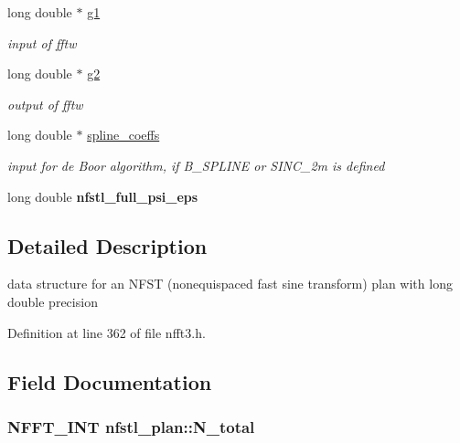 \begin{DoxyCompactItemize}
\item 
\hypertarget{structnfstl__plan_ac54e606a9b0c7c6b526fb3d44d28482a}{long double $\ast$ \hyperlink{structnfstl__plan_ac54e606a9b0c7c6b526fb3d44d28482a}{g1}}\label{structnfstl__plan_ac54e606a9b0c7c6b526fb3d44d28482a}

\begin{DoxyCompactList}\small\item\em input of fftw \end{DoxyCompactList}\item 
\hypertarget{structnfstl__plan_a0e91b301bcd4ce83aecdda2b0f7712ed}{long double $\ast$ \hyperlink{structnfstl__plan_a0e91b301bcd4ce83aecdda2b0f7712ed}{g2}}\label{structnfstl__plan_a0e91b301bcd4ce83aecdda2b0f7712ed}

\begin{DoxyCompactList}\small\item\em output of fftw \end{DoxyCompactList}\item 
\hypertarget{structnfstl__plan_a7abc2fedc757d9b2b5f985377f99bfe7}{long double $\ast$ \hyperlink{structnfstl__plan_a7abc2fedc757d9b2b5f985377f99bfe7}{spline\-\_\-coeffs}}\label{structnfstl__plan_a7abc2fedc757d9b2b5f985377f99bfe7}

\begin{DoxyCompactList}\small\item\em input for de Boor algorithm, if B\-\_\-\-S\-P\-L\-I\-N\-E or S\-I\-N\-C\-\_\-2m is defined \end{DoxyCompactList}\item 
\hypertarget{structnfstl__plan_a019dc42c22e247237373097a8b87b604}{long double {\bfseries nfstl\-\_\-full\-\_\-psi\-\_\-eps}}\label{structnfstl__plan_a019dc42c22e247237373097a8b87b604}

\end{DoxyCompactItemize}


\subsection{Detailed Description}
data structure for an N\-F\-S\-T (nonequispaced fast sine transform) plan with long double precision 

Definition at line 362 of file nfft3.\-h.



\subsection{Field Documentation}
\hypertarget{structnfstl__plan_a137fba4308a554e64ca0fb20d1e1fde5}{
\subsubsection[{N\-\_\-total}]{\setlength{\rightskip}{0pt plus 5cm}N\-F\-F\-T\-\_\-\-I\-N\-T nfstl\-\_\-plan\-::\-N\-\_\-total}}\label{structnfstl__plan_a137fba4308a554e64ca0fb20d1e1fde5}


